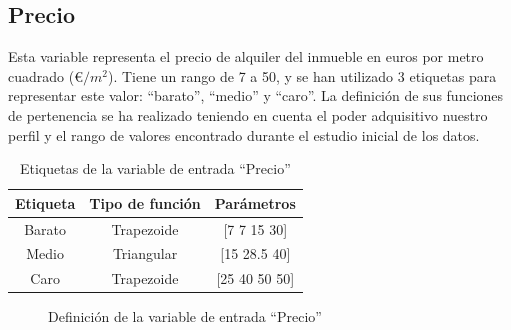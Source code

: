 \documentclass[12pt]{report} %
\begin{document}
        \subsection{Precio}
        Esta variable representa el precio de alquiler del inmueble en euros por metro cuadrado (€$/m^2$).
        Tiene un rango de 7 a 50, y se han utilizado 3 etiquetas para representar este valor: ``barato'', ``medio'' y ``caro''.
        La definición de sus funciones de pertenencia se ha realizado teniendo en cuenta el poder adquisitivo nuestro perfil y el rango de valores encontrado durante el estudio inicial de los datos.

        \begin{table}[h]
            \center
            \begin{tabular}{@{}ccc@{}}
                \toprule
                \textbf{Etiqueta} & \textbf{Tipo de función} & \textbf{Parámetros} \\
                \midrule
                Barato & Trapezoide & [7 7 15 30]   \\
                Medio  & Triangular & [15 28.5 40]  \\
                Caro   & Trapezoide & [25 40 50 50] \\
                \bottomrule
            \end{tabular}
            \caption{Etiquetas de la variable de entrada ``Precio''}
        \end{table}

        \begin{figure}[H]
            \centering
            \caption{Definición de la variable de entrada ``Precio''}
        \end{figure}
\end{document}
